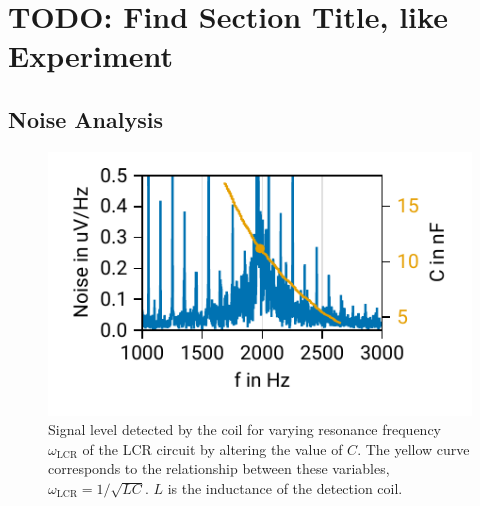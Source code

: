 \documentclass[
    parskip=half, 
    twoside=false,
    twocolumn=true,
    fontsize=11pt,
]{scrarticle}
\begin{document}
\section{TODO: Find Section Title, like Experiment}
\subsection{Noise Analysis}
\begin{figure}
    \centering
    \includegraphics{figures/01 noise.pdf}
    \caption{Signal level detected by the coil for varying resonance frequency $\omega_{\text{LCR}}$ of the LCR circuit by altering the value of $C$. The yellow curve corresponds to the relationship between these variables, $\omega_{\text{LCR}} = 1/\sqrt{LC}$. $L$ is the inductance of the detection coil.}
    \label{fig:tune_C}
\end{figure}
\end{document}
